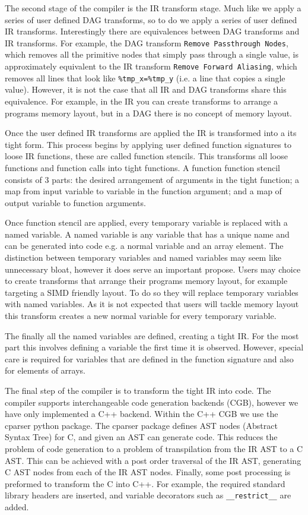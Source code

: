 The second stage of the compiler is the IR transform stage.
Much like we apply a series of user defined DAG transforms, so to do we apply a series of user defined IR transforms.
Interestingly there are equivalences between DAG transforms and IR transforms.
For example, the DAG transform \texttt{Remove Passthrough Nodes}, which removes all the primitive nodes that simply pass through a single value, is approximately equivalent to the IR transform \texttt{Remove Forward Aliasing}, which removes all lines that look like \lstinline{%tmp_x=%tmp_y} (i.e. a line that copies a single value).
However, it is not the case that all IR and DAG transforms share this equivalence.
For example, in the IR you can create transforms to arrange a programs memory layout, but in a DAG there is no concept of memory layout.

Once the user defined IR transforms are applied the IR is transformed into a its tight form.
This process begins by applying user defined function signatures to loose IR functions, these are called function stencils.
This transforms all loose functions and function calls into tight functions.
A function function stencil consists of 3 parts: the desired arrangement of arguments in the tight function; a map from input variable to variable in the function argument; and a map of output variable to function arguments.

Once function stencil are applied, every temporary variable is replaced with a named variable.
A named variable is any variable that has a unique name and can be generated into code e.g. a normal variable and an array element.
The distinction between temporary variables and named variables may seem like unnecessary bloat, however it does serve an important propose.
Users may choice to create transforms that arrange their programs memory layout, for example targeting a SIMD friendly layout.
To do so they will replace temporary variables with named variables.
As it is not expected that users will tackle memory layout this transform creates a new normal variable for every temporary variable. 

The finally all the named variables are defined, creating a tight IR.
For the most part this involves defining a variable the first time it is observed.
However, special care is required for variables that are defined in the function signature and also for elements of arrays.

The final step of the compiler is to transform the tight IR into code.
The compiler supports interchangeable code generation backends (CGB), however we have only implemented a C++ backend.
Within the C++ CGB we use the cparser python package.
The cparser package defines AST nodes (Abstract Syntax Tree) for C, and given an AST can generate code.
This reduces the problem of code generation to a problem of transpilation from the IR AST to a C AST.
This can be achieved with a post order traversal of the IR AST, generating C AST nodes from each of the IR AST nodes.
Finally, some post processing is preformed to transform the C into C++.
For example, the required standard library headers are inserted, and variable decorators such as \lstinline{__restrict__} are added.  